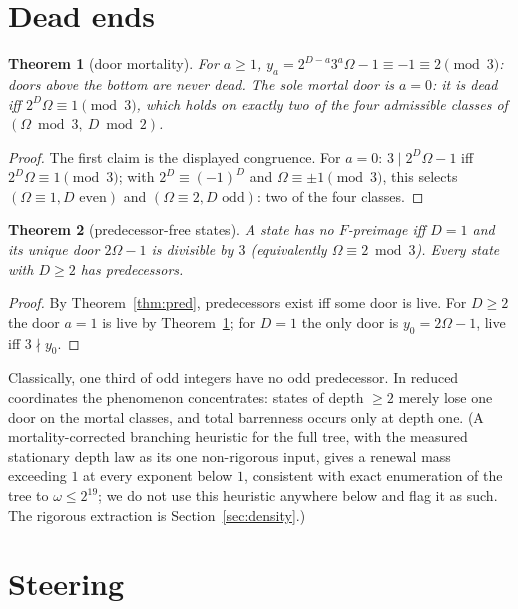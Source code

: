 \documentclass[11pt]{article}
\newtheorem{theorem}{Theorem}[section]
\theoremstyle{remark}
\newcommand{\w}{\omega}
\begin{document}
\section{Dead ends}\label{sec:dead}

\begin{theorem}[door mortality]\label{thm:mort}
For $a \ge 1$, $y_a = 2^{D-a}3^a\Omega - 1 \equiv -1 \equiv 2 \pmod 3$: doors above the bottom are never dead. The sole mortal door is $a = 0$: it is dead iff $2^D\Omega \equiv 1 \pmod 3$, which holds on exactly two of the four admissible classes of $(\Omega \bmod 3,\ D \bmod 2)$.
\end{theorem}

\begin{proof}
The first claim is the displayed congruence. For $a = 0$: $3 \mid 2^D\Omega - 1$ iff $2^D\Omega \equiv 1 \pmod 3$; with $2^D \equiv (-1)^D$ and $\Omega \equiv \pm1 \pmod 3$, this selects $(\Omega \equiv 1, D \text{ even})$ and $(\Omega \equiv 2, D \text{ odd})$: two of the four classes.
\end{proof}

\begin{theorem}[predecessor-free states]\label{thm:eden}
A state has no $F$-preimage iff $D = 1$ and its unique door $2\Omega - 1$ is divisible by $3$ (equivalently $\Omega \equiv 2 \bmod 3$). Every state with $D \ge 2$ has predecessors.
\end{theorem}

\begin{proof}
By Theorem~\ref{thm:pred}, predecessors exist iff some door is live. For $D \ge 2$ the door $a = 1$ is live by Theorem~\ref{thm:mort}; for $D = 1$ the only door is $y_0 = 2\Omega - 1$, live iff $3 \nmid y_0$.
\end{proof}

Classically, one third of odd integers have no odd predecessor. In reduced coordinates the phenomenon concentrates: states of depth $\ge 2$ merely lose one door on the mortal classes, and total barrenness occurs only at depth one. (A mortality-corrected branching heuristic for the full tree, with the measured stationary depth law as its one non-rigorous input, gives a renewal mass exceeding $1$ at every exponent below $1$, consistent with exact enumeration of the tree to $\w \le 2^{19}$; we do not use this heuristic anywhere below and flag it as such. The rigorous extraction is Section~\ref{sec:density}.)

\section{Steering}\label{sec:steer}
\end{document}
